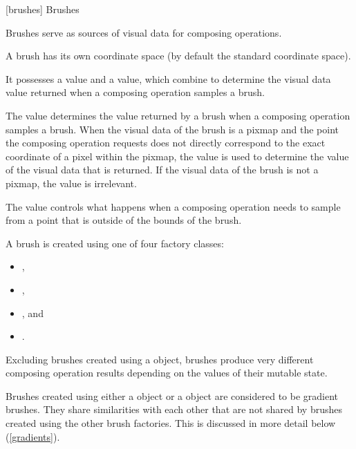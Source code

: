 
 [brushes] {Brushes}

\pnum
Brushes serve as sources of visual data for composing operations.

\pnum
A brush has its own coordinate space (by default the standard coordinate space).

\pnum
It possesses a  value and a  value, which combine to determine the visual data value returned when a composing operation samples a brush.

\pnum
The  value determines the value returned by a brush when a composing operation samples a brush. When the visual data of the brush is a pixmap and the point the composing operation requests does not directly correspond to the exact coordinate of a pixel within the pixmap, the  value is used to determine the value of the visual data that is returned. If the visual data of the brush is not a pixmap, the  value is irrelevant.

\pnum
The  value controls what happens when a composing operation needs to sample from a point that is outside of the bounds of the brush.

\pnum
A brush is created using one of four factory classes:
\begin{itemize}
\item {},
\item {},
\item {}, and
\item {}.
\end{itemize}

\pnum
Excluding brushes created using a  object, brushes produce very different composing operation results depending on the values of their mutable state.

\pnum
Brushes created using either a  object or a  object are considered to be gradient brushes. They share similarities with each other that are not shared by brushes created using the other brush factories. This is discussed in more detail below (\ref{gradients}).

\addtocounter{SectionDepthBase}{1}










\addtocounter{SectionDepthBase}{-1}

